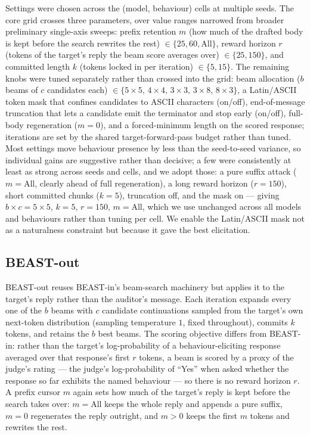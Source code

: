 \documentclass{article}
\theoremstyle{plain}
\theoremstyle{definition}
\theoremstyle{remark}
\begin{document}
Settings were chosen across the (model, behaviour) cells at multiple seeds. The core grid crosses three parameters, over value ranges narrowed from broader preliminary single-axis sweeps: prefix retention $m$ (how much of the drafted body is kept before the search rewrites the rest) $\in \{25, 60, \text{All}\}$, reward horizon $r$ (tokens of the target's reply the beam score averages over) $\in \{25, 150\}$, and committed length $k$ (tokens locked in per iteration) $\in \{5, 15\}$. The remaining knobs were tuned separately rather than crossed into the grid: beam allocation ($b$ beams of $c$ candidates each) $\in \{5\times5,\,4\times4,\,3\times3,\,3\times8,\,8\times3\}$, a Latin/ASCII token mask that confines candidates to ASCII characters (on/off), end-of-message truncation that lets a candidate emit the terminator and stop early (on/off), full-body regeneration ($m = 0$), and a forced-minimum length on the scored response; iterations are set by the shared target-forward-pass budget rather than tuned. Most settings move behaviour presence by less than the seed-to-seed variance, so individual gains are suggestive rather than decisive; a few were consistently at least as strong across seeds and cells, and we adopt those: a pure suffix attack ($m = \text{All}$, clearly ahead of full regeneration), a long reward horizon ($r = 150$), short committed chunks ($k = 5$), truncation off, and the mask on --- giving $b \times c = 5 \times 5$, $k = 5$, $r = 150$, $m = \text{All}$, which we use unchanged across all models and behaviours rather than tuning per cell. We enable the Latin/ASCII mask not as a naturalness constraint but because it gave the best elicitation.

\subsection{BEAST-out}
BEAST-out reuses BEAST-in's beam-search machinery but applies it to the target's reply rather than the auditor's message. Each iteration expands every one of the $b$ beams with $c$ candidate continuations sampled from the target's own next-token distribution (sampling temperature $1$, fixed throughout), commits $k$ tokens, and retains the $b$ best beams. The scoring objective differs from BEAST-in: rather than the target's log-probability of a behaviour-eliciting response averaged over that response's first $r$ tokens, a beam is scored by a proxy of the judge's rating --- the judge's log-probability of ``Yes'' when asked whether the response so far exhibits the named behaviour --- so there is no reward horizon $r$. A prefix cursor $m$ again sets how much of the target's reply is kept before the search takes over: $m = \text{All}$ keeps the whole reply and appends a pure suffix, $m = 0$ regenerates the reply outright, and $m > 0$ keeps the first $m$ tokens and rewrites the rest.
\end{document}
